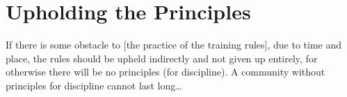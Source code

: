 
\ifhandbookedition
\vspace*{-\baselineskip}
\fi

\section{Upholding the Principles}

If there is some obstacle to [the practice of the training rules], due to time
and place, the rules should be upheld indirectly and not given up entirely, for
otherwise there will be no principles (for discipline). A community without
principles for discipline cannot last long\ldots{}


